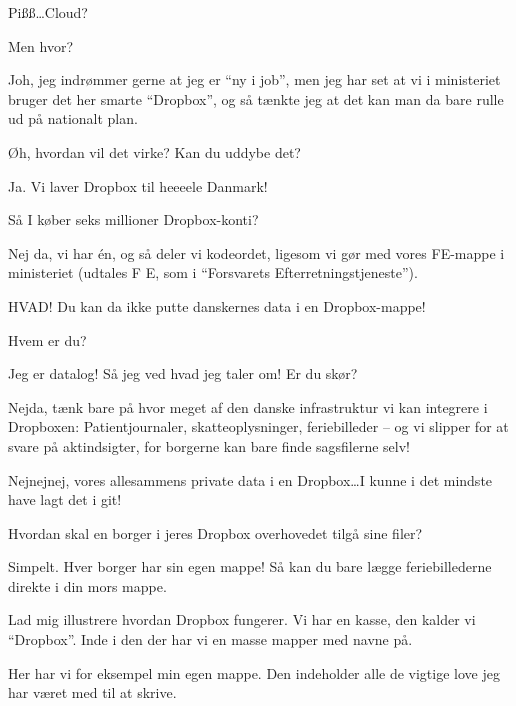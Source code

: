 \documentclass[a4paper,11pt]{article}
\begin{document}
\begin{sketch}
 Pißß\ldots Cloud?

 Men hvor?

 Joh, jeg indrømmer gerne at jeg er ``ny i job'', men jeg har set at vi
i ministeriet bruger det her smarte 
``Dropbox'', og så tænkte jeg at det kan man da bare rulle ud på nationalt plan.

 Øh, hvordan vil det virke?  Kan du uddybe det?

 Ja.   Vi laver Dropbox til heeeele
Danmark!

 Så I køber seks millioner Dropbox-konti?

 Nej da, vi har én, og så deler vi kodeordet, ligesom vi gør med vores
FE-mappe i ministeriet (udtales F E, som i ``Forsvarets Efterretningstjeneste'').


 HVAD!  Du kan da ikke putte danskernes data i en Dropbox-mappe!

 Hvem er du?

 Jeg er datalog!  Så jeg ved hvad jeg taler om!  Er du skør?

 Nejda, tænk bare på hvor meget af den danske infrastruktur vi kan
integrere i Dropboxen: Patientjournaler, skatteoplysninger, feriebilleder -- og
vi slipper for at svare på aktindsigter, for borgerne kan bare finde sagsfilerne
selv!


 Nejnejnej, vores allesammens private data i en Dropbox\ldots I kunne i
det mindste have lagt det i git!


 Hvordan skal en borger i jeres Dropbox overhovedet tilgå sine filer?

 Simpelt.  Hver borger har sin egen mappe!  Så kan du bare lægge
feriebillederne direkte i din mors mappe.

 Lad mig illustrere hvordan Dropbox fungerer.  
Vi har en kasse, den kalder vi ``Dropbox''.  Inde i den der har vi en masse
mapper med navne på.


 Her har vi for eksempel min egen mappe.  Den indeholder alle de
vigtige love jeg har været med til at skrive.


\end{sketch}
\end{document}
